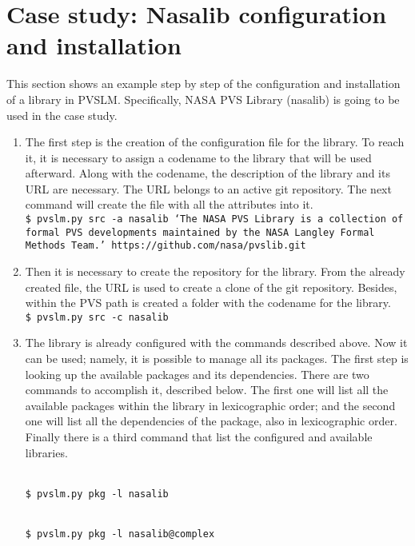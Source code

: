 \section{Case study: Nasalib configuration and installation}
\label{ssec:nasalib}

This section shows an example step by step of the configuration and installation of a library in PVSLM. Specifically, NASA PVS Library (nasalib) is going to be used in the case study.

\begin{enumerate}
\item 
  The first step is the creation of the configuration file for the library. To reach it, it is necessary to assign a codename to the library that will be used afterward. Along with the codename, the description of the library and its URL are necessary. The URL belongs to an active git repository. The next command will create the file with all the attributes into it.\\

  \texttt {\$ pvslm.py src -a nasalib `The NASA PVS Library is a collection of formal PVS developments maintained by the NASA Langley Formal Methods Team.' https://github.com/nasa/pvslib.git\\}

\item
  Then it is necessary to create the repository for the library. From the already created file, the URL is used to create a clone of the git repository. Besides, within the PVS path is created a folder with the codename for the library.\\

  \texttt {\$ pvslm.py src -c nasalib\\}

\item 
  The library is already configured with the commands described above. Now it can be used; namely, it is possible to manage all its packages. The first step is looking up the available packages and its dependencies. There are two commands to accomplish it, described below. The first one will list all the available packages within the library in lexicographic order; and the second one will list all the dependencies of the package, also in lexicographic order. Finally there is a third command that list the configured and available libraries.
  
  \texttt {\\\$ pvslm.py pkg -l nasalib}
  
  \texttt {\\\$ pvslm.py pkg -l nasalib@complex}
  

\end{enumerate}
